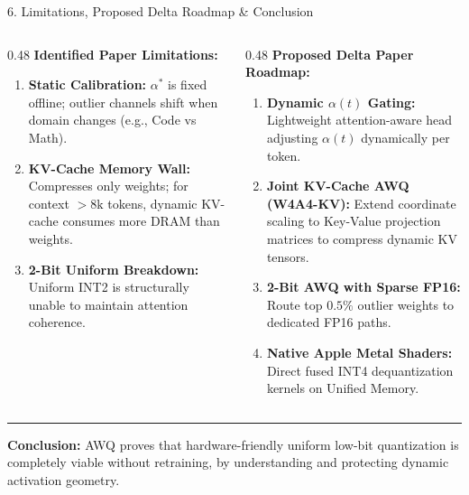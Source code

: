 \documentclass[aspectratio=169, 10pt]{beamer}
\begin{document}
\begin{frame}{6. Limitations, Proposed Delta Roadmap \& Conclusion}
  \vspace{-0.2cm}
  \begin{columns}[T]
    \begin{column}{0.48\textwidth}
      \footnotesize
      \textbf{Identified Paper Limitations:}
      \begin{enumerate}
        \setlength{\itemsep}{0.12em}
        \item \textbf{Static Calibration:} $\alpha^*$ is fixed offline; outlier channels shift when domain changes (e.g., Code vs Math).
        \item \textbf{KV-Cache Memory Wall:} Compresses only weights; for context $>8\text{k}$ tokens, dynamic KV-cache consumes more DRAM than weights.
        \item \textbf{2-Bit Uniform Breakdown:} Uniform INT2 is structurally unable to maintain attention coherence.
      \end{enumerate}
    \end{column}

    \begin{column}{0.48\textwidth}
      \footnotesize
      \textbf{Proposed Delta Paper Roadmap:}
      \begin{enumerate}
        \setlength{\itemsep}{0.12em}
        \item \textbf{Dynamic $\alpha(t)$ Gating:} Lightweight attention-aware head adjusting $\alpha(t)$ dynamically per token.
        \item \textbf{Joint KV-Cache AWQ (W4A4-KV):} Extend coordinate scaling to Key-Value projection matrices to compress dynamic KV tensors.
        \item \textbf{2-Bit AWQ with Sparse FP16:} Route top $0.5\%$ outlier weights to dedicated FP16 paths.
        \item \textbf{Native Apple Metal Shaders:} Direct fused INT4 dequantization kernels on Unified Memory.
      \end{enumerate}
    \end{column}
  \end{columns}

  \vspace{0.18cm}
  \hrule
  \vspace{0.12cm}
  \small
  \textbf{Conclusion:} AWQ proves that hardware-friendly uniform low-bit quantization is completely viable without retraining, by understanding and protecting dynamic activation geometry.
\end{frame}
\end{document}
